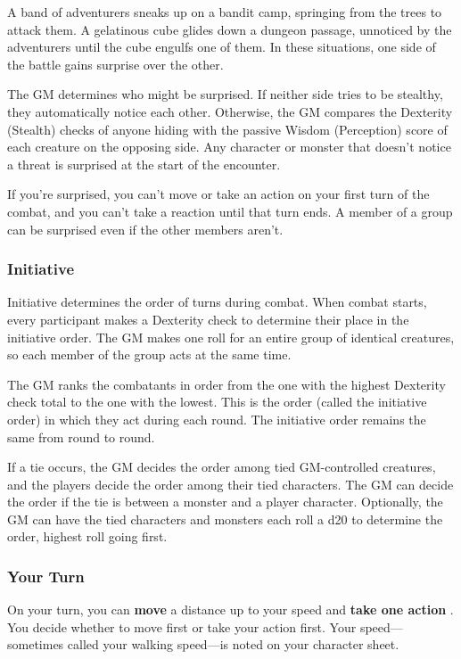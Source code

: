 \documentclass[
]{article}
\begin{document}
A band of adventurers sneaks up on a bandit camp, springing from the
trees to attack them. A gelatinous cube glides down a dungeon passage,
unnoticed by the adventurers until the cube engulfs one of them. In
these situations, one side of the battle gains surprise over the other.

The GM determines who might be surprised. If neither side tries to be
stealthy, they automatically notice each other. Otherwise, the GM
compares the Dexterity (Stealth) checks of anyone hiding with the
passive Wisdom (Perception) score of each creature on the opposing side.
Any character or monster that doesn't notice a threat is surprised at
the start of the encounter.

If you're surprised, you can't move or take an action on your first turn
of the combat, and you can't take a reaction until that turn ends. A
member of a group can be surprised even if the other members aren't.

\hypertarget{initiative}{%
\subsubsection{Initiative}\label{initiative}}

Initiative determines the order of turns during combat. When combat
starts, every participant makes a Dexterity check to determine their
place in the initiative order. The GM makes one roll for an entire group
of identical creatures, so each member of the group acts at the same
time.

The GM ranks the combatants in order from the one with the highest
Dexterity check total to the one with the lowest. This is the order
(called the initiative order) in which they act during each round. The
initiative order remains the same from round to round.

If a tie occurs, the GM decides the order among tied GM-controlled
creatures, and the players decide the order among their tied characters.
The GM can decide the order if the tie is between a monster and a player
character. Optionally, the GM can have the tied characters and monsters
each roll a d20 to determine the order, highest roll going first.

\hypertarget{your-turn}{%
\subsubsection{Your Turn}\label{your-turn}}

On your turn, you can \textbf{move} a distance up to your speed and
\textbf{take one action} . You decide whether to move first or take your
action first. Your speed---sometimes called your walking speed---is
noted on your character sheet.
\end{document}
